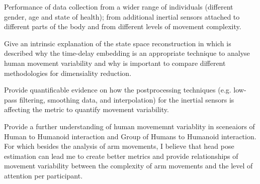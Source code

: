 \documentclass{sigchi}
\begin{document}
\begin{description}
  \setlength{\itemsep}{0pt}
  \setlength{\parskip}{0pt}
  \item [(i)]Performance of data collection from a wider range of individuals
  (different gender, age and state of health); from additional inertial sensors
  attached to different parts of the body and
  from different levels of movement complexity.

  \item [(ii)] Give an intrinsic explanation of the state space reconstruction
  in which is described why the time-delay embedding is an appropriate technique
  to analyse human movement variability and why is important to compare
  different methodologies for dimensiality reduction.

  \item [(iii)] Provide quantificable evidence on how the postprocessing techniques
  (e.g. low-pass filtering, smoothing data, and interpolation) for the inertial
  sensors is affecting the metric to quantify movement variability.

  \item [(iv)] Provide a further understanding of human movememnt variablity in
  sceneaiors of Human to Humanoid interaction and Group of Humans to Humanoid interaction.
  For which besides the analysis of arm movements, I believe that head pose estimation
  can lead me to create better metrics and provide relationships of movement
  variability between the complexity of arm movements and the level of attention
  per participant.
\end{description}







\end{document}
